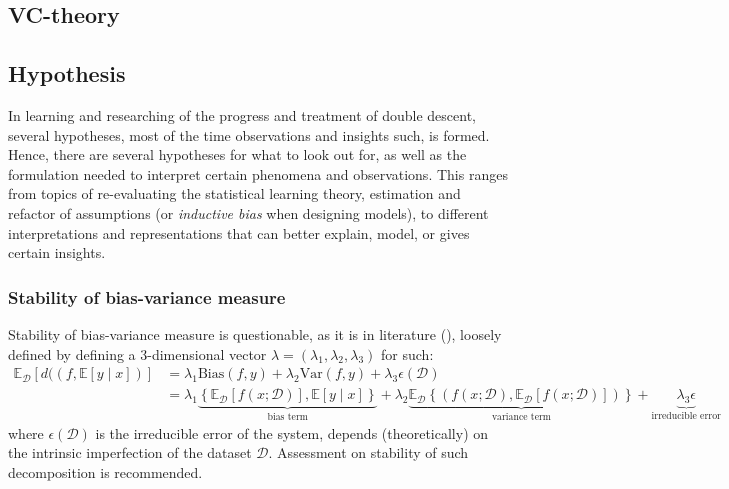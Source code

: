 \documentclass[10pt]{article} %
\begin{document}
\subsection{VC-theory}



\clearpage

\subsection{Hypothesis}

In learning and researching of the progress and treatment of double descent, several hypotheses, most of the time observations and insights such, is formed. Hence, there are several hypotheses for what to look out for, as well as the formulation needed to interpret certain phenomena and observations. This ranges from topics of re-evaluating the statistical learning theory, estimation and refactor of assumptions (or \textit{inductive bias} when designing models), to different interpretations and representations that can better explain, model, or gives certain insights.  
\subsubsection{Stability of bias-variance measure}
Stability of bias-variance measure is questionable, as it is in literature (\cite{domingos_unifeid_2000}), loosely defined by defining a 3-dimensional vector $\lambda=(\lambda_{1},\lambda_{2},\lambda_{3})$ for such: 
\noindent 
\begin{equation*}
        \begin{split}
            \mathbb{E}_{\mathcal{D}} \left[d((f,\mathbb{E}[y\mid x])\right] & = \lambda_{1} \mathrm{Bias}(f,y) + \lambda_{2}\mathrm{Var}(f,y)+ \lambda_{3}\epsilon(\mathcal{D})\\ 
            & = \lambda_{1}\underbrace{\left\{ \mathbb{E}_{\mathcal{D}}[f(x;\mathcal{D})] , \mathbb{E}[y\mid x] \right\}}_{\text{bias term}} +\lambda_{2} \underbrace{\mathbb{E}_{\mathcal{D}} \left\{(f(x;\mathcal{D}), \mathbb{E}_{\mathcal{D}}[f(x;\mathcal{D})])\right\}}_{\text{variance term}} +\underbrace{\lambda_{3}\epsilon}_{\text{irreducible error}}
        \end{split}
\end{equation*}
where $\epsilon(\mathcal{D})$ is the irreducible error of the system, depends (theoretically) on the intrinsic imperfection of the dataset $\mathcal{D}$. Assessment on stability of such decomposition is recommended. 
\end{document}
